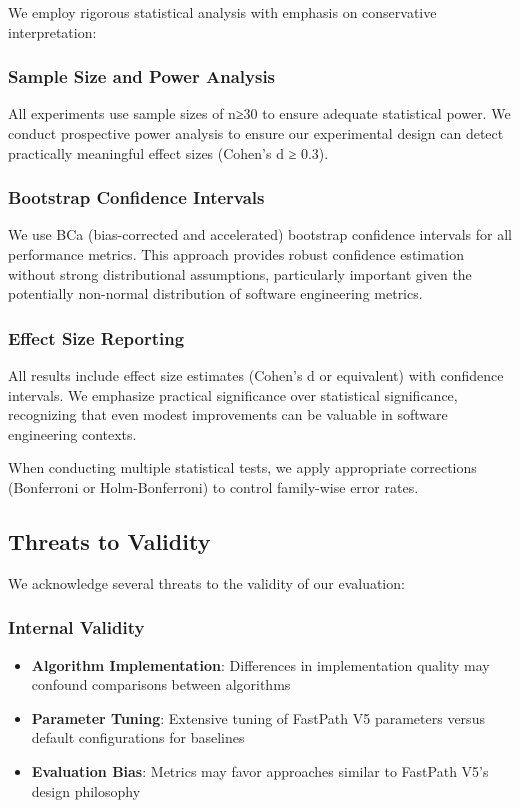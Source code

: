 \documentclass[conference]{IEEEtran}
\begin{document}
We employ rigorous statistical analysis with emphasis on conservative interpretation:

\subsubsection{Sample Size and Power Analysis}
All experiments use sample sizes of n≥30 to ensure adequate statistical power. We conduct prospective power analysis to ensure our experimental design can detect practically meaningful effect sizes (Cohen's d ≥ 0.3).

\subsubsection{Bootstrap Confidence Intervals}
We use BCa (bias-corrected and accelerated) bootstrap confidence intervals for all performance metrics. This approach provides robust confidence estimation without strong distributional assumptions, particularly important given the potentially non-normal distribution of software engineering metrics.

\subsubsection{Effect Size Reporting}
All results include effect size estimates (Cohen's d or equivalent) with confidence intervals. We emphasize practical significance over statistical significance, recognizing that even modest improvements can be valuable in software engineering contexts.

When conducting multiple statistical tests, we apply appropriate corrections (Bonferroni or Holm-Bonferroni) to control family-wise error rates.

\subsection{Threats to Validity}

We acknowledge several threats to the validity of our evaluation:

\subsubsection{Internal Validity}
\begin{itemize}
\item \textbf{Algorithm Implementation}: Differences in implementation quality may confound comparisons between algorithms
\item \textbf{Parameter Tuning}: Extensive tuning of FastPath V5 parameters versus default configurations for baselines
\item \textbf{Evaluation Bias}: Metrics may favor approaches similar to FastPath V5's design philosophy
\end{itemize}
\end{document}
